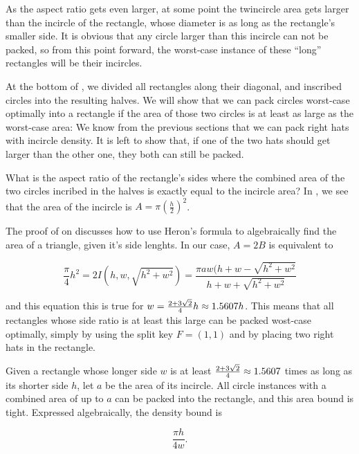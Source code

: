 \documentclass[a4paper,style=print,oneside,bibliography=totoc,nexus,lnum,extramargin]{tubsbook}
\begin{document}
As the aspect ratio gets even larger, at some point the twincircle area gets larger than the incircle of the rectangle, whose diameter is as long as the rectangle's smaller side. It is obvious that any circle larger than this incircle can not be packed, so from this point forward, the worst-case instance of these “long” rectangles will be their incircles.


At the bottom of , we divided all rectangles along their diagonal, and inscribed circles into the resulting halves. We will show that we can pack circles worst-case optimally into a rectangle if the area of those two circles is at least as large as the worst-case area:
We know from the previous sections that we can pack right hats with incircle density. It is left to show that, if one of the two hats should get larger than the other one, they both can still be packed.

What is the aspect ratio of the rectangle's sides where the combined area of the two circles incribed in the halves is exactly equal to the incircle area? In , we see that the area of the incircle is $A = \pi(\frac{h}{2})^2$.


The proof of  on  discusses how to use Heron's formula to algebraically find the area of a triangle, given it's side lenghts.
In our case, $A = 2B$ is equivalent to

$$\frac{\pi}{4}h^2 = 2I(h,w,\sqrt{h^2+w^2}) = \frac{\pi aw(h+w-\sqrt{h^2+w^2}}{h+w+\sqrt{h^2+w^2}}$$

and this equation this is true for $w = \frac{2+3\sqrt{2}}{4}h \approx 1.5607h$.
This means that all rectangles whose side ratio is at least this large can be packed wost-case optimally, simply by using the split key $F = (1,1)$ and by placing two right hats in the rectangle.

\begin{theorem}
    Given a rectangle whose longer side $w$ is at least $\frac{2+3\sqrt{2}}{4} \approx 1.5607$ times as long as its shorter side $h$, let $a$ be the area of its incircle.
    All circle instances with a combined area of up to $a$ can be packed into the rectangle, and this area bound is tight. Expressed algebraically, the density bound is

    $$\frac{\pi h}{4w}.$$

\end{theorem}
\end{document}
